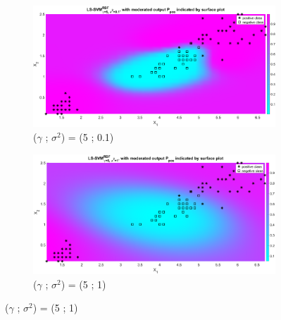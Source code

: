 \documentclass[12pt]{report}
\begin{document}
{ \begin{figure}[!htbp] 
	\centering
	\begin{subfigure}{.33\textwidth}
		\centering
		\includegraphics[height=0.8\linewidth,width=1\linewidth]{Ex1.3.4_gam5_sig0.1.eps}
		\caption{($\gamma$ ; $\sigma^2$) = (5 ; 0.1)}
		\label{fig:gam5_sig0.1}
	\end{subfigure}%
	\begin{subfigure}{.33\textwidth}
		\centering
		\includegraphics[height=0.8\linewidth,width=1\linewidth]{Ex1.3.4_gam5_sig1.eps}
		\caption{($\gamma$ ; $\sigma^2$) = (5 ; 1)}
		\label{fig:gam5_sig1}
	\end{subfigure}%

\end{figure}}
\end{document}
